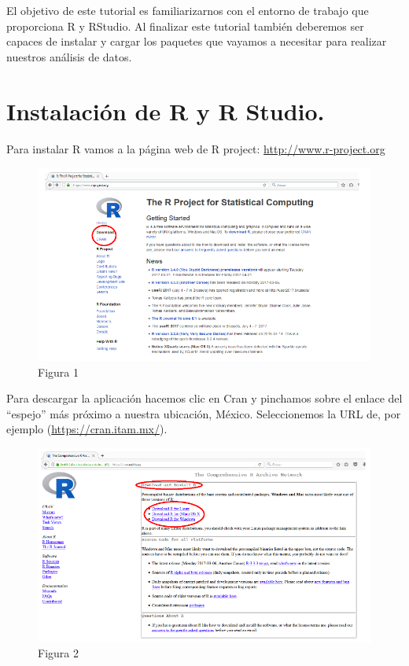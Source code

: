 \documentclass[
]{book}
\begin{document}
El objetivo de este tutorial es familiarizarnos con el entorno de trabajo que proporciona R y RStudio. Al finalizar este tutorial también deberemos ser capaces de instalar y cargar los paquetes que vayamos a necesitar para realizar nuestros análisis de datos.

\hypertarget{instalaciuxf3n-de-r-y-r-studio.}{%
\section{Instalación de R y R Studio.}\label{instalaciuxf3n-de-r-y-r-studio.}}

Para instalar R vamos a la página web de R project: \url{http://www.r-project.org}

\begin{figure}
\centering
\includegraphics{imagenes/01.png}
\caption{Figura 1}
\end{figure}

Para descargar la aplicación hacemos clic en Cran y pinchamos sobre el enlace del ``espejo'' más próximo a nuestra ubicación, México. Seleccionemos la URL de, por ejemplo (\url{https://cran.itam.mx/}).

\begin{figure}
\centering
\includegraphics{imagenes/02.png}
\caption{Figura 2}
\end{figure}
\end{document}
